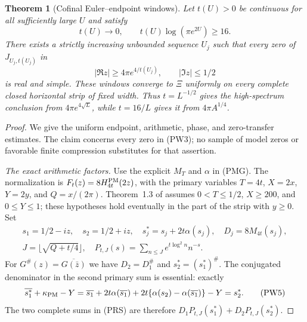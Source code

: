 \documentclass[11pt]{article}
\newtheorem{theorem}{Theorem}
\theoremstyle{remark}\newtheorem{remark}[theorem]{Remark}
\begin{document}
\begin{theorem}[Cofinal Euler--endpoint windows]
\label{thm:physical-windows}
Let $t(U)>0$ be continuous for all sufficiently large $U$ and satisfy
\[
 t(U)\longrightarrow0,
 \qquad t(U)\log(\pi e^{2U})\ge16.                    \tag{PW2}
\]
There exists a strictly increasing unbounded sequence $U_j$ such that
every zero of $J_{U_j,t(U_j)}$ in
\[
 |\Re z|\ge4\pi e^{4/t(U_j)},\qquad |\Im z|\le1/2    \tag{PW3}
\]
is real and simple. These windows converge to $\Xi$ uniformly on every
complete closed horizontal strip of fixed width. Thus $t=L^{-1/2}$
gives the high-spectrum conclusion from $4\pi e^{4\sqrt L}$, while
$t=16/L$ gives it from $4\pi A^{1/4}$.
\end{theorem}

\begin{proof}
We give the uniform endpoint, arithmetic, phase, and zero-transfer
estimates. The claim concerns every zero in (PW3); no sample of model
zeros or favorable finite compression substitutes for that assertion.

\emph{The exact arithmetic factors.}
Use the explicit $M_T$ and $\alpha$ in (PMG). The normalization is
$F_t(z)=8H^{\rm PM}_{4t}(2z)$, with the primary variables
$T=4t$, $X=2x$, $Y=2y$, and $Q=x/(2\pi)$. Theorem~1.3 of
\cite[printed p.~6, eqs.~(13)--(24)]{PolymathHeat} assumes
$0<T\le1/2$, $X\ge200$, and $0\le Y\le1$; these hypotheses
hold eventually in the part of the strip with $y\ge0$.
Set
\[
 \begin{gathered}
 s_1=1/2-iz,\quad s_2=1/2+iz,\quad
 s_j^*=s_j+2t\alpha(s_j),\quad D_j=8M_{4t}(s_j),\\
 J=\lfloor\sqrt{Q+t/4}\rfloor,
 \quad P_{t,J}(s)=\sum_{n\le J}e^{t\log^2 n}n^{-s}.
 \end{gathered}                                      \tag{PW4}
\]
For $G^\#(z)=\overline{G(\bar z)}$ we have $D_2=D_1^\#$
and $s_2^*=(s_1^*)^\#$. The conjugated denominator in the second
primary sum is essential: exactly
\[
 \overline{s_1^*}+\kappa_{\rm PM}-Y
 =\overline{s_1}+2t\alpha(\overline{s_1})
  +2t\{\alpha(s_2)-\alpha(\overline{s_1})\}-Y=s_2^*.
                                                            \tag{PW5}
\]
The two complete sums in (PRS) are therefore
$D_1P_{t,J}(s_1^*)+D_2P_{t,J}(s_2^*)$.


\end{proof}
\end{document}
